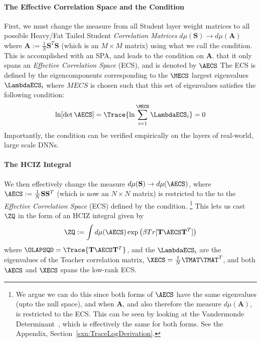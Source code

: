 \paragraph{The Effective Correlation Space and the \TRACELOG Condition}
First, we must change the measure from all Student layer weight matrices
to all possible Heavy/Fat Tailed Student \emph{Correlation Matrices}
$d\mu(\mathbf{S})\rightarrow d\mu(\mathbf{A})$
where
$\mathbf{A}:=\tfrac{1}{N}\mathbf{S}^{T}\mathbf{S}$ (which is an $M \times M$ matrix)
using what we call the \TRACELOG condition.
This is accomplished with an SPA, and leads to the condition on $\mathbf{A}$.
that it only spans an \emph{Effective Correlation Space} (ECS), and is denoted by
$\AECS$  The ECS is defined by the eigencomponents corresponding to the
$\MECS$ largest eigenvalues $\LambdaECS_{i}$
where $MECS$ is chosen such that this set of eigenvalues satisfies
the following condition:
\begin{align}
  \ln[\det \AECS]=\Trace{\ln \sum_{i=1}^{\MECS}\LambdaECS_{i}}=0
\end{align}
Importantly, the \TRACELOG condition can be verified empirically on the layers
of real-world, large scale DNNs.

\paragraph{The HCIZ Integral}
We then effectively change the measure $d\mu(\mathbf{S})\rightarrow d\mu(\AECS)$,
where  $\AECS:=\tfrac{1}{N}\mathbf{S}\mathbf{S}^{T}$  (which is now an $N \times N$ matrix)
is restricted to the  to the \emph{Effective Correlation Space} (ECS) defined by the \TRACELOG condition.
\footnote{
We argue we can do this since both forms of $\AECS$ have the same eigenvalues (upto the null space),
 and when $\mathbf{A}$, and also therefore the measure $d\mu(\mathbf{A})$, is restricted to the ECS.
 This can be seen by looking at the Vandermonde Determinant~\cite{Vandermonde},
  which is effectively the same for both forms. See the Appendix, Section~\ref{sxn:TraceLogDerivation}.
 }
This lets us cast $\ZQ$ in the form of an HCIZ integral given by
\begin{align}
  \label{eqn:ZQ}
  \ZQ:= \int d\mu(\AECS) \exp\left(\beta Tr[\mathbf{T}\AECS\mathbf{T}^{T}]\right)
\end{align}
where $\OLAPSQD=\Trace{\mathbf{T}\AECS\mathbf{T}^{T}}$,
and the $\LambdaECS_{i}$ are the eigenvalues of the Teacher correlation matrix, $\XECS=\frac{1}{N}\TMAT\TMAT^{T}$,
and both $\AECS$ and $\XECS$  spans the low-rank ECS.

